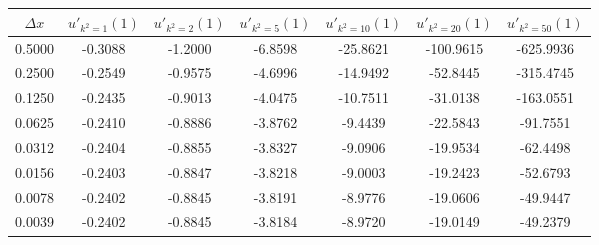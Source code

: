 \begin{tabular}{|c|c|c|c|c|c|c|}
\hline
\textbf{$\Delta x$}&\textbf{$u'_{k^2=1}(1)$}&\textbf{$u'_{k^2=2}(1)$}&\textbf{$u'_{k^2=5}(1)$}&\textbf{$u'_{k^2=10}(1)$}&\textbf{$u'_{k^2=20}(1)$}&\textbf{$u'_{k^2=50}(1)$}\\\hline
0.5000&-0.3088&-1.2000&-6.8598&-25.8621&-100.9615&-625.9936\\\hline
0.2500&-0.2549&-0.9575&-4.6996&-14.9492&-52.8445&-315.4745\\\hline
0.1250&-0.2435&-0.9013&-4.0475&-10.7511&-31.0138&-163.0551\\\hline
0.0625&-0.2410&-0.8886&-3.8762&-9.4439&-22.5843&-91.7551\\\hline
0.0312&-0.2404&-0.8855&-3.8327&-9.0906&-19.9534&-62.4498\\\hline
0.0156&-0.2403&-0.8847&-3.8218&-9.0003&-19.2423&-52.6793\\\hline
0.0078&-0.2402&-0.8845&-3.8191&-8.9776&-19.0606&-49.9447\\\hline
0.0039&-0.2402&-0.8845&-3.8184&-8.9720&-19.0149&-49.2379\\\hline
\end{tabular}
